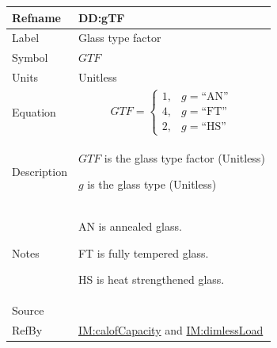 \documentclass[12pt]{article}
\begin{document}
\medskip
\noindent
\begin{minipage}{\textwidth}
\begin{tabular}{>{\raggedright}p{}>{\raggedright\arraybackslash}p{}}
\toprule \textbf{Refname} & \textbf{DD:gTF}
\label{DD:gTF}
\\ \midrule
Label & Glass type factor
        
\\ \midrule
Symbol & $\mathit{GTF}$
         
\\ \midrule
Units & Unitless
        
\\ \midrule
Equation & \begin{displaymath}
           \mathit{GTF}=\begin{cases}
                        1, & g=\text{``AN''}\\
                        4, & g=\text{``FT''}\\
                        2, & g=\text{``HS''}
                        \end{cases}
           \end{displaymath}
\\ \midrule
Description & \begin{symbDescription}
              \item{$\mathit{GTF}$ is the glass type factor (Unitless)}
              \item{$g$ is the glass type (Unitless)}
              \end{symbDescription}
\\ \midrule
Notes & AN is annealed glass.
        
        FT is fully tempered glass.
        
        HS is heat strengthened glass.
        
\\ \midrule
Source & \cite{astm2009}
         
\\ \midrule
RefBy & \hyperref[IM:calofCapacity]{IM:calofCapacity} and \hyperref[IM:dimlessLoad]{IM:dimlessLoad}
        
\\ \bottomrule
\end{tabular}
\end{minipage}
\end{document}
